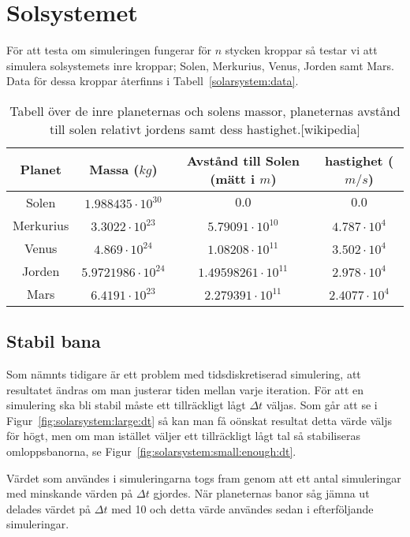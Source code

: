 \documentclass[a4]{article}
\begin{document}
\section{Solsystemet}
För att testa om simuleringen fungerar för $n$ stycken kroppar så testar vi att
simulera solsystemets inre kroppar; Solen, Merkurius, Venus, Jorden samt Mars.
Data för dessa kroppar återfinns i Tabell~\vref{solarsystem:data}.

\begin{table}
\begin{center}
\begin{tabular}{c|c|c|c}
	Planet    & Massa ($kg$) & Avstånd till Solen (mätt i $m$) & hastighet ($m/s$)\\
	\hline
	Solen     & $1.988435 \cdot 10^{30}$  & $0.0$                      & $0.0$ \\
	Merkurius & $3.3022 \cdot 10^{23}$    & $5.79091 \cdot 10^{10}$    &  $4.787 \cdot 10^4$ \\
	Venus     & $4.869 \cdot 10^{24}$     & $1.08208 \cdot 10^{11}$    &  $3.502 \cdot 10^4$ \\ 
	Jorden    & $5.9721986 \cdot 10^{24}$ & $1.49598261 \cdot 10^{11}$ &  $2.978 \cdot 10^4$ \\
	Mars      & $6.4191 \cdot 10^{23}$    & $2.279391 \cdot 10^{11}$   &  $2.4077 \cdot 10^4$
\end{tabular}
\caption{
	Tabell över de inre planeternas och solens massor, planeternas avstånd till
	solen relativt jordens samt dess hastighet.[wikipedia]
}
\label{solarsystem:data}
\end{center}
\end{table}
	

		\subsection{Stabil bana}
Som nämnts tidigare är ett problem med tidsdiskretiserad simulering, att
resultatet ändras om man justerar tiden mellan varje iteration.
För att en simulering ska bli stabil måste ett tillräckligt lågt $\Delta t$
väljas.
Som går att se i Figur~\vref{fig:solarsystem:large:dt} så kan man få oönskat
resultat detta värde väljs för högt, men om man istället väljer ett
tillräckligt lågt tal så stabiliseras omloppsbanorna, se
Figur~\vref{fig:solarsystem:small:enough:dt}.

Värdet som användes i simuleringarna togs fram genom att ett antal simuleringar
med minskande värden på $\Delta t$ gjordes. 
När planeternas banor såg jämna ut delades värdet på $\Delta t$ med 10 och
detta värde användes sedan i efterföljande simuleringar.
\end{document}
